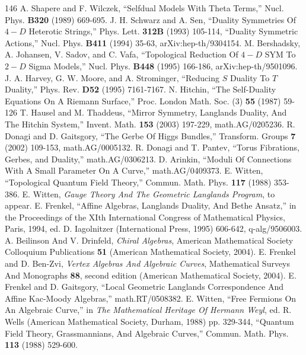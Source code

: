 \begin{thebibliography}{146}
 A. Shapere and F. Wilczek, ``Selfdual Models With Theta Terms,'' Nucl. Phys. \textbf{B320} (1989) 669-695.
 J. H. Schwarz and A. Sen, ``Duality Symmetries Of $4-D$ Heterotic Strings,'' Phys. Lett. \textbf{312B} (1993) 105-114, ``Duality Symmetric Actions,'' Nucl. Phys. \textbf{B411} (1994) 35-63, arXiv:hep-th/9304154.
 M. Bershadsky, A. Johansen, V. Sadov, and C. Vafa, ``Topological Reduction Of $4-D$ SYM To $2-D$ Sigma Models,'' Nucl. Phys. \textbf{B448} (1995) 166-186, arXiv:hep-th/9501096.
 J. A. Harvey, G. W. Moore, and A. Strominger, ``Reducing $S$ Duality To $T$ Duality,'' Phys. Rev. \textbf{D52} (1995) 7161-7167.
 N. Hitchin, ``The Self-Duality Equations On A Riemann Surface,'' Proc. London Math. Soc. (3) \textbf{55} (1987) 59-126
 T. Hausel and M. Thaddeus, ``Mirror Symmetry, Langlands Duality, And The Hitchin System,'' Invent. Math. \textbf{153} (2003) 197-229, math.AG/0205236.
 R. Donagi and D. Gaitsgory, ``The Gerbe Of Higgs Bundles,'' Transform. Groups \textbf{7} (2002) 109-153, math.AG/0005132.
 R. Donagi and T. Pantev, ``Torus Fibrations, Gerbes, and Duality,'' math.AG/0306213.
 D. Arinkin, ``Moduli Of Connections With A Small Parameter On A Curve,'' math.AG/0409373.
 E. Witten, ``Topological Quantum Field Theory,'' Commun. Math. Phys. \textbf{117} (1988) 353-386.
 E. Witten, \emph{Gauge Theory And The Geometric Langlands Program}, to appear.
 E. Frenkel, ``Affine Algebras, Langlands Duality, And Bethe Ansatz,'' in the Proceedings of the XIth International Congress of Mathematical Physics, Paris, 1994, ed. D. Iagolnitzer (International Press, 1995) 606-642, q-alg/9506003.
 A. Beilinson And V. Drinfeld, \emph{Chiral Algebras}, American Mathematical Society Colloquium Publications \textbf{51} (American Mathematical Society, 2004).
 E. Frenkel and D. Ben-Zvi, \emph{Vertex Algebras And Algebraic Curves}, Mathematical Surveys And Monographs \textbf{88}, second edition (American Mathematical Society, 2004).
 E. Frenkel and D. Gaitsgory, ``Local Geometric Langlands Correspondence And Affine Kac-Moody Algebras,'' math.RT/0508382.
 E. Witten, ``Free Fermions On An Algebraic Curve,'' in \emph{The Mathematical Heritage Of Hermann Weyl}, ed. R. Wells (American Mathematical Society, Durham, 1988) pp. 329-344, ``Quantum Field Theory, Grassmannians, And Algebraic Curves,'' Commun. Math. Phys. \textbf{113} (1988) 529-600.

\end{thebibliography}

